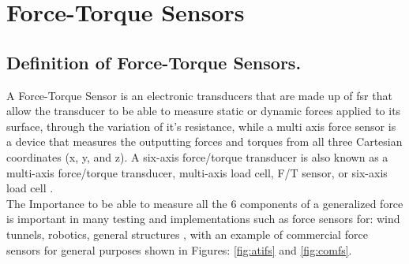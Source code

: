 \newpage
\section{Force-Torque Sensors}
\subsection{Definition of Force-Torque Sensors.}
A Force-Torque Sensor is an electronic transducers that are made up of \ac{fsr} \cite{Florez2010} that allow the transducer to be able to measure static or dynamic forces applied to its surface, through the variation of it's resistance, while a multi axis force sensor is a device that measures the outputting forces and torques from all three Cartesian coordinates (x, y, and z). A six-axis force/torque transducer is also known as a multi-axis force/torque transducer, multi-axis load cell, F/T sensor, or six-axis load cell \cite{atifts}.\\
The Importance to be able to measure all the 6 components of a generalized force is important in many testing and implementations such as force sensors for: wind tunnels, robotics, general structures \cite{Ballo2014,ATI2013,Jost2020}, with an example of commercial force sensors for general purposes shown in Figures: \ref{fig:atifs} and \ref{fig:comfs}.

